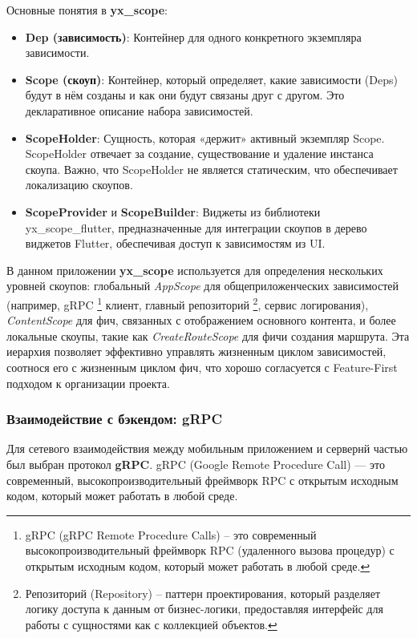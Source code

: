 Основные понятия в \textbf{yx\_scope}:
\begin{itemize}
    \item \textbf{Dep (зависимость)}: Контейнер для одного конкретного экземпляра зависимости.
    \item \textbf{Scope (скоуп)}: Контейнер, который определяет, какие зависимости (Deps) будут в нём созданы и как они будут связаны друг с другом. Это декларативное описание набора зависимостей.
    \item \textbf{ScopeHolder}: Сущность, которая «держит» активный экземпляр Scope. ScopeHolder отвечает за создание, существование и удаление инстанса скоупа. Важно, что ScopeHolder не является статическим, что обеспечивает локализацию скоупов.
    \item \textbf{ScopeProvider} и \textbf{ScopeBuilder}: Виджеты из библиотеки yx\_scope\_flutter, предназначенные для интеграции скоупов в дерево виджетов Flutter, обеспечивая доступ к зависимостям из UI.
\end{itemize}

В данном приложении \textbf{yx\_scope} используется для определения нескольких уровней скоупов: глобальный \textit{AppScope} для общеприложенческих зависимостей (например, gRPC \footnote{gRPC (gRPC Remote Procedure Calls) – это современный высокопроизводительный фреймворк RPC (удаленного вызова процедур) с открытым исходным кодом, который может работать в любой среде.} клиент, главный репозиторий \footnote{Репозиторий (Repository) – паттерн проектирования, который разделяет логику доступа к данным от бизнес-логики, предоставляя интерфейс для работы с сущностями как с коллекцией объектов.}, сервис логирования), \textit{ContentScope} для фич, связанных с отображением основного контента, и более локальные скоупы, такие как \textit{CreateRouteScope} для фичи создания маршрута. Эта иерархия позволяет эффективно управлять жизненным циклом зависимостей, соотнося его с жизненным циклом фич, что хорошо согласуется с Feature-First подходом к организации проекта.



\subsubsection*{Взаимодействие с бэкендом: gRPC}
Для сетевого взаимодействия между мобильным приложением и сервернй частью был выбран протокол \textbf{gRPC}. gRPC (Google Remote Procedure Call) — это современный, высокопроизводительный фреймворк RPC с открытым исходным кодом, который может работать в любой среде.

